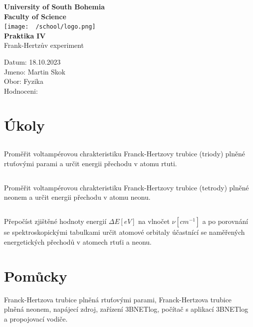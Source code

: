 \documentclass{article}
\begin{document}
\begin{center}
\textbf{\Huge{University of South Bohemia}}\\
\vspace{50px}
\textbf{\Large{Faculty of Science}} \\
\vspace{30px}
\texttt{[image: ~/school/logo.png]} \\
\vspace{30px}
\textbf{\large{Praktika IV}}
\vspace{20px}
\\
\vspace{20px}
\large{Frank-Hertzův experiment} \\
\vspace{60px}
\end{center}
\begin{flushleft}
Datum: 18.10.2023 \\
Jmeno: Martin Skok \\
Obor: Fyzika \\
Hodnoceni:
\end{flushleft}
\newpage
\section{Úkoly}
\subsection{}
Proměřit voltampérovou chrakteristiku Franck-Hertzovy trubice (triody) plněné
rtuťovými parami a určit energii přechodu v atomu rtuti.
\subsection{}
Proměřit voltampérovou chrakteristiku Franck-Hertzovy trubice (tetrody) plněné
neonem a určit energii přechodu v atomu neonu.
\subsection{}
Přepočíst zjištěné hodnoty energií $\Delta E [eV]$ na vlnočet $\nu [cm^{-1}]$ a po porovnání
se spektroskopickými tabulkami určit atomové orbitaly účastnící se naměřených energetických
přechodů v atomech rtuťi a neonu.
\section{Pomůcky}
Franck-Hertzova trubice plněná rtuťovými parami, Franck-Hertzova trubice plněná neonem,
napájecí zdroj, zařízení 3BNETlog, počítač s aplikací 3BNETlog a propojovací vodiče.
\end{document}
